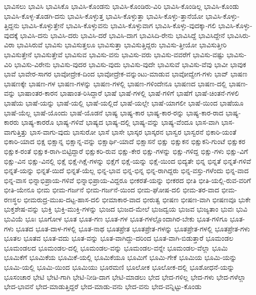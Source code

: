 {ಭಾವಿಸಲು
ಭಾವಿಸಿ
ಭಾವಿಸಿಕೊ
ಭಾವಿಸಿ-ಕೊಂಡನು
ಭಾವಿಸಿ-ಕೊಂಡಿರು-ವಿರಿ
ಭಾವಿಸಿ-ಕೊಂಡಿಲ್ಲ
ಭಾವಿಸಿ-ಕೊಂಡು
ಭಾವಿಸಿ-ಕೊಳ್ಳ-ತೊಡಗಿ-ದನು
ಭಾವಿಸಿ-ಕೊಳ್ಳುತ್ತ
ಭಾವಿಸಿ-ಕೊಳ್ಳುತ್ತಾ
ಭಾವಿಸಿ-ಕೊಳ್ಳು-ತ್ತಾನೆಯೋ
ಭಾವಿಸಿ-ಕೊಳ್ಳು-ತ್ತಿದ್ದನು
ಭಾವಿಸಿ-ಕೊಳ್ಳುತ್ತೇನೆ
ಭಾವಿಸಿ-ಕೊಳ್ಳುವನು
ಭಾವಿಸಿ-ಕೊಳ್ಳುವಾಗ
ಭಾವಿಸಿ-ಕೊಳ್ಳು-ವುದಕ್ಕಾ-ಗಲಿ
ಭಾವಿಸಿ-ಕೊಳ್ಳು-ವುದಕ್ಕೆ
ಭಾವಿಸಿ-ದನು
ಭಾವಿಸಿ-ದರು
ಭಾವಿಸಿ-ದರೆ
ಭಾವಿಸಿ-ದಾಗ
ಭಾವಿಸಿದಿ-ರೇನು
ಭಾವಿಸಿದ್ದೆ
ಭಾವಿಸಿದ್ದೇನೆ
ಭಾವಿಸಿರು-ವಿರಾ
ಭಾವಿಸಿರುವೆ
ಭಾವಿಸು
ಭಾವಿಸುತ್ತಲೂ
ಭಾವಿಸುತ್ತಾ
ಭಾವಿಸುತ್ತಿದ್ದರು
ಭಾವಿಸು-ತ್ತೀಯೋ
ಭಾವಿಸುತ್ತೀರಿ
ಭಾವಿಸುತ್ತೇನೆ
ಭಾವಿಸುತ್ತೇವೆ
ಭಾವಿಸುವ
ಭಾವಿಸು-ವನು
ಭಾವಿಸು-ವರು
ಭಾವಿಸು-ವವರೆಗೆ
ಭಾವಿಸು-ವಷ್ಟು
ಭಾವಿಸು-ವಿರಿ
ಭಾವಿಸು-ವಿರೇನು
ಭಾವಿಸು-ವುದರ
ಭಾವಿಸು-ವುದು
ಭಾವಿಸು-ವುದೇ
ಭಾವಿಸುವೆ
ಭಾವಿಸು-ವೆವು
ಭಾವೀ
ಭಾವುಕ
ಭಾವೆ
ಭಾವೇರ-ಸಾಗರ
ಭಾವೋದ್ರೇಕ-ದಿಂದ
ಭಾವೋದ್ರೇಕ-ವನ್ನುಂಟು-ಮಾಡುವ
ಭಾವೋದ್ವೇಗ-ಗಳು
ಭಾವ್
ಭಾಷಣ
ಭಾಷಣಕ್ಕೇ
ಭಾಷಣ-ಗಳ
ಭಾಷಣ-ಗಳನ್ನು
ಭಾಷಣ-ಗಳಲ್ಲಿ
ಭಾಷಣ-ಗಳಿಂದೇನೂ
ಭಾಷಣದ
ಭಾಷಣ-ದಲ್ಲಿ
ಭಾಷಣ-ವನ್ನು
ಭಾಷಾಂತರ-ಕಾರನ
ಭಾಷಾಂತ-ರಿಸಿದ್ದಾರೆ
ಭಾಷೆ
ಭಾಷೆ-ಗಳಲ್ಲಿ
ಭಾಷೆ-ಗಳಿಗೆ
ಭಾಷೆಗೆ
ಭಾಷೆ-ಚಿಂತನೆ-ಗಳಲಿ
ಭಾಷೆಯ
ಭಾಷೆ-ಯನ್ನು
ಭಾಷೆ-ಯಲ್ಲಿ
ಭಾಷೆ-ಯಲ್ಲಿದೆ
ಭಾಷೆ-ಯಲ್ಲೇ
ಭಾಷೆ-ಯಾಗಲೀ
ಭಾಷೆ-ಯಿಂದ
ಭಾಷೆಯೂ
ಭಾಷೆ-ಯೆಲ್ಲ
ಭಾಷೆ-ಯೊಂದು
ಭಾಷೆ-ಯೊಡನೆ
ಭಾಷ್ಯ
ಭಾಷ್ಯ-ಕಾರ
ಭಾಷ್ಯ-ಕಾರ-ರನ್ನು
ಭಾಷ್ಯ-ಕಾರ-ರಾದ
ಭಾಷ್ಯ-ಕಾರರು
ಭಾಷ್ಯ-ಕಾರರೊ
ಭಾಷ್ಯ-ಗಳಿವೆ
ಭಾಷ್ಯದ
ಭಾಷ್ಯ-ದಲ್ಲಿ
ಭಾಷ್ಯ-ವನ್ನು
ಭಾಷ್ಯ-ವೆಂದೂ
ಭಾಸ-ವಾಗಿ
ಭಾಸ-ವಾಗುತ್ತಿತ್ತು
ಭಾಸ-ವಾಗು-ವುದು
ಭಾಸುರೋ
ಭಾಸೆ
ಭಾಸೇ
ಭಾಸ್ಕರ
ಭಾಸ್ಕರನ
ಭಾಸ್ವರ
ಭಾಸ್ವರನೆ
ಭಿಕಾರಿ-ಯಂತೆ
ಭಿಕಾರಿ-ಯಾದ
ಭಿಕ್ಷ
ಭಿಕ್ಷಾನ್ನ
ಭಿಕ್ಷಾನ್ನ-ವನ್ನು
ಭಿಕ್ಷಾರ್ಥಿ-ಯಾದೆ
ಭಿಕ್ಷಾಸನೆ
ಭಿಕ್ಷು
ಭಿಕ್ಷುಕನ
ಭಿಕ್ಷುಕನಿ-ಗುಂಟೆ
ಭಿಕ್ಷುಕರ
ಭಿಕ್ಷುಕ-ರಂತೆ
ಭಿಕ್ಷುಕ-ರಾಗಿ-ಬಿಟ್ಟಿದ್ದಾರೆ
ಭಿಕ್ಷುಕರಿ-ರುವ
ಭಿಕ್ಷು-ಕೇರ
ಭಿಕ್ಷು-ಗಳನ್ನು
ಭಿಕ್ಷು-ಗಳಿದ್ದ
ಭಿಕ್ಷು-ಗಳು
ಭಿಕ್ಷು-ವಿಗೆ
ಭಿಕ್ಷು-ವಿನ
ಭಿಕ್ಷು-ವಿನಲ್ಲಿ
ಭಿಕ್ಷೆ
ಭಿಕ್ಷೆ-ಗಿಕ್ಷೆ-ಗಳನ್ನು
ಭಿಕ್ಷೆಗೆ
ಭಿಕ್ಷೆ-ಯನ್ನು
ಭಿಕ್ಷೆ-ಯಿಂದ
ಭಿದ್ಯತೇ
ಭಿನ್ನ
ಭಿನ್ನತೆ
ಭಿನ್ನತೆ-ಗಳಿವೆ
ಭಿನ್ನತೆ-ಯನ್ನು
ಭಿನ್ನತೆ-ಯಿದೆ
ಭಿನ್ನತೆ-ಯೆಲ್ಲ
ಭಿನ್ನ-ಭಾವ
ಭಿನ್ನ-ಭಿನ್ನ
ಭಿನ್ನ-ರಾಗಿದ್ದರು
ಭಿನ್ನ-ವಸ್ತು-ಗಳೆಂದು
ಭಿನ್ನ-ವಾದ
ಭಿನ್ನ-ವಾಸ
ಭಿನ್ನಾಭಿಪ್ರಾಯ-ಗಳಿವೆ
ಭಿನ್ನಾಭಿಪ್ರಾಯ-ವಿದ್ದರೂ
ಭೀಕರತೆ-ಯನ್ನು
ಭೀಕರದ
ಭೀತಿ
ಭೀತಿ-ಯಲ್ಲಿ-ರುವ-ವರಿಗೆ
ಭೀತಿ-ಯೇನೂ
ಭೀಮ
ಭೀಮ-ಗರ್ಜನೆ
ಭೀಮ-ಗರ್ಜನೆ-ಯಿಂದ
ಭೀಮ-ಘೋಷ-ದಲಿ
ಭೀಮ-ತರ-ವಾದ
ಭೀಮ-ರಣಸ್ಥಲ
ಭೀಮರುದ್ರ-ಮುಖ-ದಟ್ಟ-ಹಾಸ-ದಲಿ
ಭೀಮಾಕಾರ-ವಾದ
ಭೀರುತ್ವ
ಭೀಷಣ
ಭೀಷಣ-ವಾಗಿ
ಭೀಷಣವೂ
ಭುಕೇ
ಭುಕ್ತಶೇಷ-ವನ್ನು
ಭುಕ್ತಿ
ಭುಕ್ತಿ-ಮುಕ್ತಿ-ಗಳನ್ನು
ಭುಜದ
ಭುಜದ-ಮೇಲೆ
ಭುಜದ್ವಯ
ಭುಜವ
ಭುಜ್ಯತಾಂ
ಭುವಃ
ಭುವಿ
ಭುವಿಯೆ
ಭೂಃ
ಭೂಗೋಳ
ಭೂತ
ಭೂತ-ಗಣ
ಭೂತ-ಗಳ
ಭೂತ-ಗಳಲ್ಲೊಂದಾಗಿರ-ಬೇಕು
ಭೂತ-ಗಳಿಗೂ
ಭೂತ-ಗಳು
ಭೂತದ
ಭೂತ-ದಾಳ-ಗಳಲ್ಲಿ
ಭೂತ-ನಾಥ
ಭೂತಪ್ರೇತ
ಭೂತಪ್ರೇತ-ಗಳನ್ನು
ಭೂತಪ್ರೇತ-ಗಳಲ್ಲಿ
ಭೂತಪ್ರೇತ-ಗಳು
ಭೂತಲ
ಭೂತವ
ಭೂತ-ವದು
ಭೂತ-ವನ್ನು
ಭೂತ-ವಾಗಿದ್ದು-ದರಿಂದ
ಭೂತ-ವಾಗಿ-ಬಿಡುತ್ತಾರೆ
ಭೂಮಂಡಲ
ಭೂಮಂಡಲದ
ಭೂಮಂಡಲ-ದಲ್ಲಿ
ಭೂಮಂಡಲ-ವನ್ನು
ಭೂಮಂಡಲ-ವನ್ನೇ
ಭೂಮಂಡಲ-ವೆಲ್ಲಾ
ಭೂಮಿ
ಭೂಮಿಕೆಗೆ
ಭೂಮಿಕೆಯ
ಭೂಮಿಕೆ-ಯಲ್ಲಿ
ಭೂಮಿಕೆಯೂ
ಭೂಮಿಗೆ
ಭೂಮಿ-ಗೇಕೆ
ಭೂಮಿಯ
ಭೂಮಿ-ಯನ್ನು
ಭೂಮಿ-ಯಲ್ಲಿ
ಭೂಮಿ-ಯಿಂದ
ಭೂಮಿಯು
ಭೂರಮಣಿ
ಭೂಲೋಕ
ಭೂಲೋಕ-ದಲ್ಲಿ
ಭೂಶೋಧನೆ-ಯನ್ನು
ಭೂಸಂಚಾರ
ಭೇಟಿ
ಭೇಟಿ-ಗಾಗಿ
ಭೇಟಿ-ನೀಡಿ-ದಾಗ
ಭೇಟಿ-ಮಾಡಲು
ಭೇದ
ಭೇದ-ಗಳಿಲ್ಲ
ಭೇದ-ಗಳು
ಭೇದ-ಗಳೆಲ್ಲಾ
ಭೇದ-ಭಾವನೆ
ಭೇದ-ಮಾಡುತ್ತಿದ್ದರೆ
ಭೇದ-ಮಾಡು-ವನು
ಭೇದ-ವನು
ಭೇದ-ವನ್ನಿಟ್ಟು-ಕೊಂಡು
}
